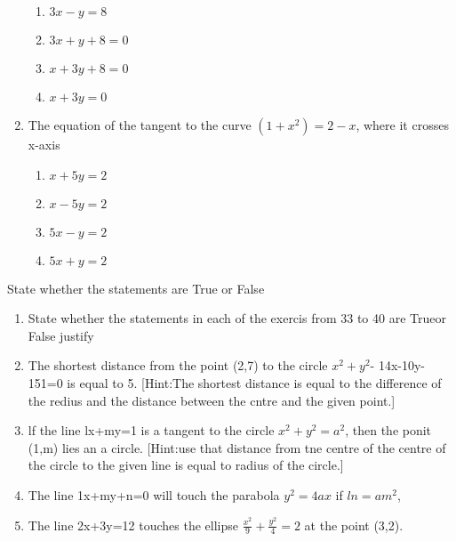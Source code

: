 \begin{enumerate}[label=\thesection.\arabic*,ref=\thesection.\theenumi]
 \begin{enumerate}
 \item $3x-y=8$
 \item $3x+y+8=0$
 \item $x+3y+8=0$
 \item $x+3y=0$
 \end{enumerate}
\item The equation of the tangent to the curve $(1+x^2) =2-x$, where it crosses x-axis
\begin{enumerate}
\item $x+5y=2$
\item $x-5y=2$
\item $5x-y=2$
\item $5x+y=2$
\end{enumerate}
\end{enumerate}
State whether the statements are True or False 
\begin{enumerate}[label=\thesection.\arabic*,ref=\thesection.\theenumi,resume*]
\item State whether the statements in each of the exercis from 33 to 40 are Trueor False justify
\item The shortest distance from the point (2,7) to the circle $x^2+y^2$- 14x-10y-151=0 is equal to 5.
[Hint:The shortest distance is equal to the difference of the redius and the distance between  the  cntre and the given point.]
\item lf the line lx+my=1 is a tangent to the circle $x^2+y^2=a^2$, then the ponit (1,m) lies an a circle.
[Hint:use that distance from tne centre of the centre of the circle to the given line is equal to radius of the circle.]
\item The line 1x+my+n=0 will touch the parabola $y^2=4 ax$ if $ln =am^2$,
\item The line 2x+3y=12 touches the ellipse $\frac{x^2}{9}+\frac{y^2}{4}=2$ at the point (3,2).
\end{enumerate}
